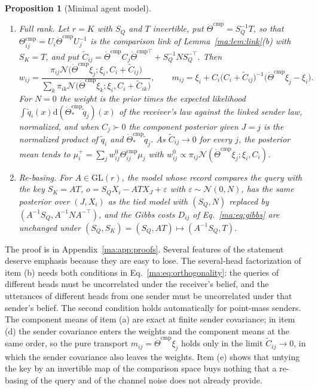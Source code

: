 \documentclass[11pt]{article}
\newtheorem{proposition}[theorem]{Proposition}
\theoremstyle{definition}
\theoremstyle{remark}
\providecommand{\GL}{\mathrm{GL}}
\newcommand{\Nset}{\mathcal N}
\newcommand{\Gauss}{\mathcal N}
\newcommand{\Thr}{\mathring\Theta^{\mathrm{cmp}}}
\newcommand{\Thcmp}{\Theta^{\mathrm{cmp}}}
\newcommand{\Mcmp}{M^{\mathrm{cmp}}}
\newcommand{\qt}{\widetilde q}
\begin{document}
\begin{proposition}[Minimal agent model]
\begin{enumerate}
\begin{equation}
\mu_i^+=U_i(I_K-\Pi_i)U_i^{-1}\mu_i+\sum_{j\in\Nset_i}w_{ij}\Mcmp_{ij}\mu_j,\qquad
\Mcmp_{ij}=U_iR_{Q,i}TU_j^{-1},
\label{ma:eq:local}
\end{equation}
and we call $\Mcmp_{ij}$ the induced comparison link. Under the passive action the weights are unchanged, $\Mcmp_{ij}\mapsto g_i\Mcmp_{ij}g_j^{-1}$, and the local posterior mean $\mu_i^+=U_i\xi_i^+$ and covariance $\Sigma_i^+=U_iC_i^+U_i^\top$ map to $g_i\mu_i^+$ and $g_i\Sigma_i^+g_i^\top$.
\item[(d)] Full rank. Let $r=K$ with $S_Q$ and $T$ invertible, put $\Thr=S_Q^{-1}T$, so that $\Thcmp_{ij}=U_i\Thr U_j^{-1}$ is the comparison link of Lemma~\ref{ma:lem:link}(b) with $S_K=T$, and put $\widetilde C_{ij}=\Thr C_j\mathring\Theta^{\mathrm{cmp}\top}+S_Q^{-1}NS_Q^{-\top}$. Then
\begin{equation}
w_{ij}=\frac{\pi_{ij}\Gauss\bigl(\Thr\xi_j;\xi_i,C_i+\widetilde C_{ij}\bigr)}{\sum_k\pi_{ik}\Gauss\bigl(\Thr\xi_k;\xi_i,C_i+\widetilde C_{ik}\bigr)},\qquad
m_{ij}=\xi_i+C_i\bigl(C_i+\widetilde C_{ij}\bigr)^{-1}\bigl(\Thr\xi_j-\xi_i\bigr).
\label{ma:eq:full_rank}
\end{equation}
For $N=0$ the weight is the prior times the expected likelihood $\int\qt_i(x)\mathrm d(\Thr_*\qt_j)(x)$ of the receiver's law against the linked sender law, normalized, and when $C_j\succ0$ the component posterior given $J=j$ is the normalized product of $\qt_i$ and $\Thr_*\qt_j$. As $\widetilde C_{ij}\to0$ for every $j$, the posterior mean tends to $\mu_i^+=\sum_jw^0_{ij}\Thcmp_{ij}\mu_j$ with $w^0_{ij}\propto\pi_{ij}\Gauss(\Thr\xi_j;\xi_i,C_i)$.
\item[(e)] Re-basing. For $A\in\GL(r)$, the model whose record compares the query with the key $S_K=AT$, $o=S_QX_i-ATX_J+\varepsilon$ with $\varepsilon\sim\Gauss(0,N)$, has the same posterior over $(J,X_i)$ as the tied model with $(S_Q,N)$ replaced by $(A^{-1}S_Q,A^{-1}NA^{-\top})$, and the Gibbs costs $D_{ij}$ of Eq.~\eqref{ma:eq:gibbs} are unchanged under $(S_Q,S_K)=(S_Q,AT)\mapsto(A^{-1}S_Q,T)$.
\end{enumerate}
\end{proposition}

The proof is in Appendix~\ref{ma:app:proofs}. Several features of the statement deserve emphasis because they are easy to lose. The several-head factorization of item (b) needs both conditions in Eq.~\eqref{ma:eq:orthogonality}: the queries of different heads must be uncorrelated under the receiver's belief, and the utterances of different heads from one sender must be uncorrelated under that sender's belief. The second condition holds automatically for point-mass senders. The component means of item (a) are exact at finite sender covariance; in item (d) the sender covariance enters the weights and the component means at the same order, so the pure transport $m_{ij}=\Thr\xi_j$ holds only in the limit $\widetilde C_{ij}\to0$, in which the sender covariance also leaves the weights. Item (e) shows that untying the key by an invertible map of the comparison space buys nothing that a re-basing of the query and of the channel noise does not already provide.
\end{document}

